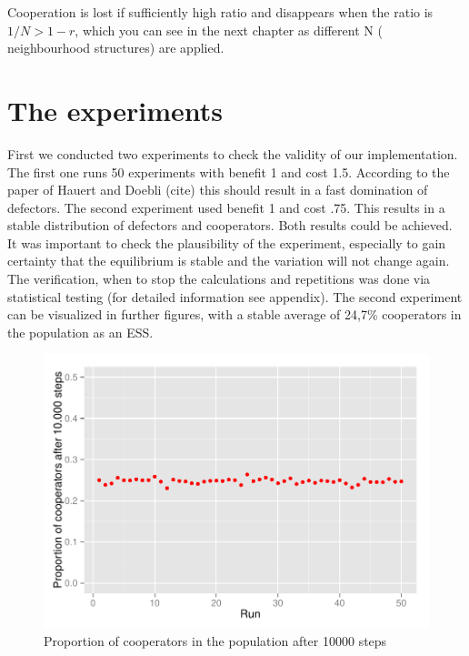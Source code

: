 \documentclass[DIV=calc, paper=a4, fontsize=11pt, twocolumn]{scrartcl}	 %
\begin{document}
Cooperation is lost if sufficiently high ratio and disappears when the ratio is $1/N > 1- r$, which you can see in the next chapter as different N ( neighbourhood structures) are applied. 





\section*{The experiments}

First we conducted two experiments to check the validity of our implementation.
The first one runs 50 experiments with benefit 1 and cost 1.5. According to the paper of Hauert and Doebli (cite) this should result in a fast domination of defectors. The second experiment used benefit 1 and cost .75. This results in a stable distribution of defectors and cooperators. Both results could be achieved. It was important to check the plausibility of the experiment, especially to gain certainty that the equilibrium is stable and the variation will not change again. The verification, when to stop the calculations and repetitions was done via statistical testing (for detailed information see appendix).
The second experiment can be visualized in further figures, with a stable average of 24,7\% cooperators in the population as an ESS. \\

\begin{figure}[here]
\centering
\begin{minipage}{.48\textwidth}
  \centering
  \includegraphics[width=1\linewidth]{task1prop}
 \caption{Proportion of cooperators in the population after 10000 steps}
\label{fig:PDspatialcluster}
\end{minipage}%
\end{figure}
\end{document}
